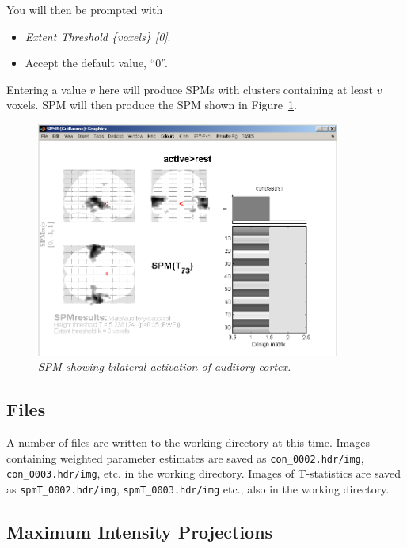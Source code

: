 
You will then be prompted with

\begin{itemize}
\item \emph{Extent Threshold \{voxels\} [0]}.
\item Accept the default value, ``0''.
\end{itemize}

Entering a value $v$ here will produce SPMs with clusters containing at least $v$ voxels. SPM will then produce the SPM shown in Figure~\ref{aud_spm1}.

\begin{figure}
\begin{center}
\includegraphics[width=100mm]{auditory/spm1}
\caption{\em SPM showing bilateral activation of auditory cortex. \label{aud_spm1}}
\end{center}
\end{figure}

\subsection{Files}

A number of files are written to the working directory at this time.
Images containing weighted parameter estimates are saved as \texttt{con\_0002.hdr/img}, \texttt{con\_0003.hdr/img}, etc. in the working directory. Images of T-statistics are saved as \texttt{spmT\_0002.hdr/img}, \texttt{spmT\_0003.hdr/img} etc., also in the working directory.

\subsection{Maximum Intensity Projections}

